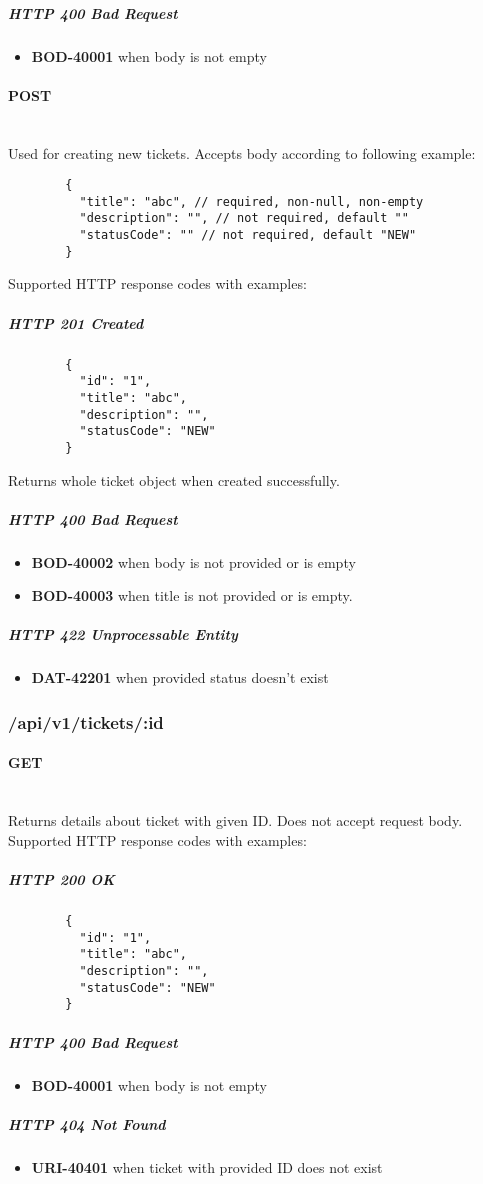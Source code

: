 \documentclass[a4paper]{article}
\newcommand{\newLineParagraph}[1]{\paragraph{#1}\mbox{}\\}
\begin{document}
    \subparagraph{HTTP 400 Bad Request}
    \begin{itemize}
        \item \textbf{BOD-40001} when body is not empty
    \end{itemize}

    \newLineParagraph{POST}
    Used for creating new tickets. Accepts body according to following example:
    \begin{verbatim}
        {
          "title": "abc", // required, non-null, non-empty
          "description": "", // not required, default ""
          "statusCode": "" // not required, default "NEW"
        }
    \end{verbatim}
    Supported HTTP response codes with examples:
    \subparagraph{HTTP 201 Created}
    \begin{verbatim}
        {
          "id": "1",
          "title": "abc",
          "description": "",
          "statusCode": "NEW"
        }
    \end{verbatim}
    Returns whole ticket object when created successfully.

    \subparagraph{HTTP 400 Bad Request}
    \begin{itemize}
        \item \textbf{BOD-40002} when body is not provided or is empty
        \item \textbf{BOD-40003} when title is not provided or is empty.
    \end{itemize}

    \subparagraph{HTTP 422 Unprocessable Entity}
    \begin{itemize}
        \item \textbf{DAT-42201} when provided status doesn't exist
    \end{itemize}

    \subsubsection{/api/v1/tickets/:id}
    \newLineParagraph{GET}
    Returns details about ticket with given ID. Does not accept request body. \\
    Supported HTTP response codes with examples:
    \subparagraph{HTTP 200 OK}
    \begin{verbatim}
        {
          "id": "1",
          "title": "abc",
          "description": "",
          "statusCode": "NEW"
        }
    \end{verbatim}
    \subparagraph{HTTP 400 Bad Request}
    \begin{itemize}
        \item \textbf{BOD-40001} when body is not empty
    \end{itemize}
    \subparagraph{HTTP 404 Not Found}
    \begin{itemize}
        \item \textbf{URI-40401} when ticket with provided ID does not exist
    \end{itemize}
\end{document}
